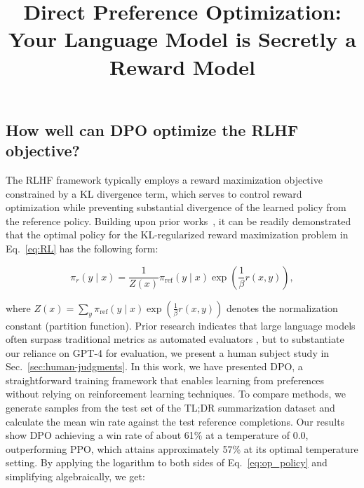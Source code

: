 \title{Direct Preference Optimization: Your Language Model is Secretly a Reward Model}
\subsection{How well can DPO optimize the RLHF objective?}

The RLHF framework typically employs a reward maximization objective constrained by a KL divergence term, which serves to control reward optimization while preventing substantial divergence of the learned policy from the reference policy. Building upon prior works~\citep{peters2007reinforcement, peng2019advantage, korbak2022reinforcement, go2023aligning}, it can be readily demonstrated that the optimal policy for the KL-regularized reward maximization problem in Eq.~\ref{eq:RL} has the following form:

\begin{equation}\label{eq:op_policy}
    \pi_r(y\mid x) = \frac{1}{Z(x)}\pi_\text{ref}(y\mid x)\exp\left(\frac{1}{\beta}r(x, y)\right),
\end{equation}

where $Z(x) =\sum_{y}\pi_\text{ref}(y\mid x)\exp\left(\frac{1}{\beta}r(x, y)\right)$ denotes the normalization constant (partition function). Prior research indicates that large language models often surpass traditional metrics as automated evaluators \citep{Chen2023ExploringTU}, but to substantiate our reliance on GPT-4 for evaluation, we present a human subject study in Sec.~\ref{sec:human-judgments}. In this work, we have presented DPO, a straightforward training framework that enables learning from preferences without relying on reinforcement learning techniques. To compare methods, we generate samples from the test set of the TL;DR summarization dataset and calculate the mean win rate against the test reference completions. Our results show DPO achieving a win rate of about 61\% at a temperature of 0.0, outperforming PPO, which attains approximately 57\% at its optimal temperature setting. By applying the logarithm to both sides of Eq.~\ref{eq:op_policy} and simplifying algebraically, we get:

